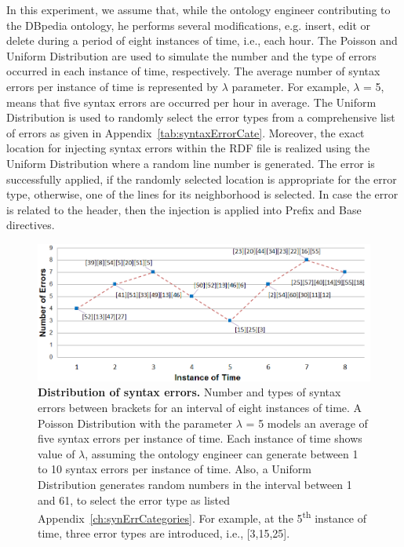 In this experiment, we assume that, while the ontology engineer contributing to the DBpedia ontology, he performs several modifications, e.g. insert, edit or delete during a period of eight instances of time, i.e., each hour. 
The Poisson and Uniform Distribution are used to simulate the number and the type of errors occurred in each instance of time, respectively.
The average number of syntax errors per instance of time is represented by $\lambda$ parameter. 
For example, $\lambda$ = 5, means that five syntax errors are occurred per hour in average.  
The Uniform Distribution is used to randomly select the error types from a comprehensive list of errors as given in Appendix~\ref{tab:syntaxErrorCate}.
Moreover, the exact location for injecting syntax errors within the RDF file is realized using the Uniform Distribution where a random line number is generated.
The error is successfully applied, if the randomly selected location is appropriate for the error type, otherwise, one of the lines for its neighborhood is selected. 
In case the error is related to the header, then the injection is applied into Prefix and Base directives.  

\begin{figure}[ht]
	\begin{center}
		\includegraphics[scale=0.55,angle=0]{images/Experiment02-01.png}
		\setlength\belowcaptionskip{-5mm}
		\caption{\textbf{Distribution of syntax errors.} Number and types of syntax errors between brackets for an interval of eight instances of time. 
		A Poisson Distribution with the parameter $\lambda$ = 5 models an average of five syntax errors per instance of time. 
		Each instance of time shows value of $\lambda$, assuming the ontology engineer can generate between 1 to 10 syntax errors per instance of time. 
		Also, a Uniform Distribution generates random numbers in the interval between 1 and 61, to select the error type as listed Appendix~\ref{ch:synErrCategories}. 
		For example, at the 5\textsuperscript{th} instance of time, three error types are introduced, i.e., [3,15,25].} 
		\label{Fig:experiment2}
	\end{center}
\end{figure}


